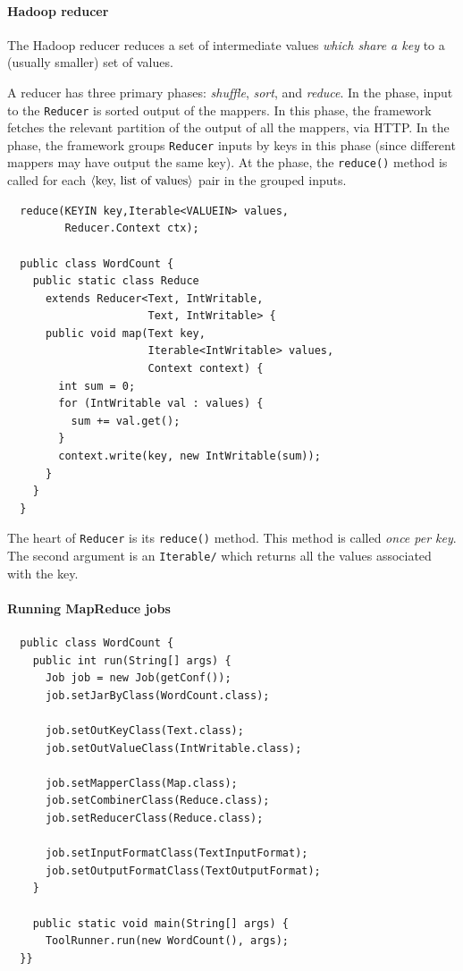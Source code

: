 \documentclass{memo}
\begin{document}
\paragraph{Hadoop reducer}
The Hadoop reducer reduces a set of intermediate values {\em which share
  a key\/} to a (usually smaller) set of values. 

A {reducer} has three primary phases: {\em shuffle\/}, {\em sort\/}, and
{\em reduce\/}. In the  phase, input to the {\tt Reducer} is
sorted output of the mappers. In this phase, the framework fetches the
relevant partition of the output of all the mappers, via HTTP. In the
 phase, the framework groups {\tt Reducer} inputs by keys in this
phase (since different mappers may have output the same key). 
At the  phase, the {\tt reduce()} method is called for each 
$\mbox{$\langle{\textit{\mbox{\em key, list of values}}}\rangle$}$ pair in the grouped inputs. 
\begin{verbatim}
  reduce(KEYIN key,Iterable<VALUEIN> values,
         Reducer.Context ctx);

  public class WordCount {
    public static class Reduce 
      extends Reducer<Text, IntWritable, 
                      Text, IntWritable> {
      public void map(Text key, 
                      Iterable<IntWritable> values,
                      Context context) {
        int sum = 0;
        for (IntWritable val : values) {
          sum += val.get();
        }
        context.write(key, new IntWritable(sum));
      }
    }
  }
\end{verbatim}
The heart of {\tt Reducer} is its {\tt reduce()} method.  This method is
called {\em once per key\/}. The second argument is an {\tt Iterable/} which
returns all the values associated with the key. 

\paragraph{Running MapReduce jobs}

\begin{verbatim}
  public class WordCount {
    public int run(String[] args) {
      Job job = new Job(getConf());
      job.setJarByClass(WordCount.class);

      job.setOutKeyClass(Text.class);
      job.setOutValueClass(IntWritable.class);

      job.setMapperClass(Map.class);
      job.setCombinerClass(Reduce.class);
      job.setReducerClass(Reduce.class);

      job.setInputFormatClass(TextInputFormat);
      job.setOutputFormatClass(TextOutputFormat);
    }

    public static void main(String[] args) {
      ToolRunner.run(new WordCount(), args);
  }}
\end{verbatim}
\end{document}
